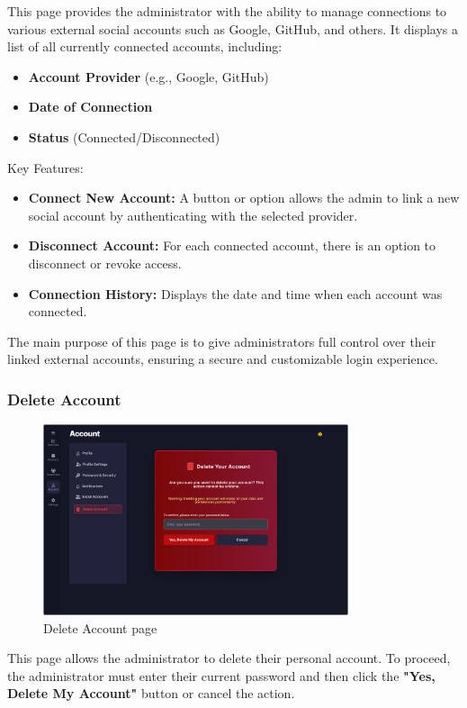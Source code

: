 \documentclass[12pt]{article}
\begin{document}
	This page provides the administrator with the ability to manage connections to various external social accounts such as Google, GitHub, and others. It displays a list of all currently connected accounts, including:
	\begin{itemize}
		\item \textbf{Account Provider} (e.g., Google, GitHub)
		\item \textbf{Date of Connection}
		\item \textbf{Status} (Connected/Disconnected)
	\end{itemize}
	Key Features:
	\begin{itemize}
		\item \textbf{Connect New Account:} A button or option allows the admin to link a new social account by authenticating with the selected provider.
		\item \textbf{Disconnect Account:} For each connected account, there is an option to disconnect or revoke access.
		\item \textbf{Connection History:} Displays the date and time when each account was connected.
	\end{itemize}
	The main purpose of this page is to give administrators full control over their linked external accounts, ensuring a secure and customizable login experience.
	
	\subsubsection{Delete Account}
	\begin{figure}[H]
		\centering
		\includegraphics[width=0.8\textwidth]{pictures/admin/Delete_Admin}
		\caption{Delete Account page}\label{fig:figure9}
	\end{figure}
	This page allows the administrator to delete their personal account.
	To proceed, the administrator must enter their current password and then click the \textbf{"Yes, Delete My Account"} button or cancel the action.
	
\end{document}
